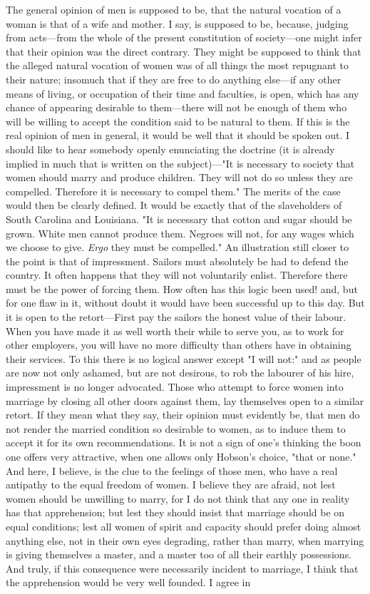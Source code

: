 \documentclass[12pt]{report}
\begin{document}
The general opinion of men is supposed to be, that the natural vocation of a woman is that of a wife and mother. I say, is supposed to be, because, judging from acts—from the whole of the present constitution of society—one might infer that their opinion was the direct contrary. They might be supposed to think that the alleged natural vocation of women was of all things the most repugnant to their nature; insomuch that if they are free to do anything else—if any other means of living, or occupation of their time and faculties, is open, which has any chance of appearing desirable to them—there will not be enough of them who will be willing to accept the condition said to be natural to them. If this is the real opinion of men in general, it would be well that it should be spoken out. I should like to hear somebody openly enunciating the doctrine (it is already implied in much that is written on the subject)—"It is necessary to society that women should marry and produce children. They will not do so unless they are compelled. Therefore it is necessary to compel them." The merits of the case would then be clearly defined. It would be exactly that of the slaveholders of South Carolina and Louisiana. "It is necessary that cotton and sugar should be grown. White men cannot produce them. Negroes will not, for any wages which we choose to give. \emph{Ergo} they must be compelled." An illustration still closer to the point is that of impressment. Sailors must absolutely be had to defend the country. It often happens that they will not voluntarily enlist. Therefore there must be the power of forcing them. How often has this logic been used! and, but for one flaw in it, without doubt it would have been successful up to this day. But it is open to the retort—First pay the sailors the honest value of their labour. When you have made it as well worth their while to serve you, as to work for other employers, you will have no more difficulty than others have in obtaining their services. To this there is no logical answer except "I will not:" and as people are now not only ashamed, but are not desirous, to rob the labourer of his hire, impressment is no longer advocated. Those who attempt to force women into marriage by closing all other doors against them, lay themselves open to a similar retort. If they mean what they say, their opinion must evidently be, that men do not render the married condition so desirable to women, as to induce them to accept it for its own recommendations. It is not a sign of one's thinking the boon one offers very attractive, when one allows only Hobson's choice, "that or none." And here, I believe, is the clue to the feelings of those men, who have a real antipathy to the equal freedom of women. I believe they are afraid, not lest women should be unwilling to marry, for I do not think that any one in reality has that apprehension; but lest they should insist that marriage should be on equal conditions; lest all women of spirit and capacity should prefer doing almost anything else, not in their own eyes degrading, rather than marry, when marrying is giving themselves a master, and a master too of all their earthly possessions. And truly, if this consequence were necessarily incident to marriage, I think that the apprehension would be very well founded. I agree in 
\end{document}
